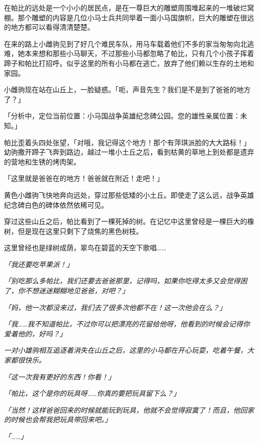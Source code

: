 \horizonline


在帕比的远处是一个小小的居民点，是在一尊巨大的雕塑周围堆起来的一堆破烂窝棚。那个雕塑的内容是几位小马士兵共同举着一面小马国旗帜，巨大的雕塑在很远的地方都可以看得清清楚楚。

在来的路上小雌驹见到了好几个难民车队，用马车载着他们不多的家当匆匆向北逃难，她本来想和那些小马聊天，不过那些小马都忽略了帕比，只有几个小孩子挥着蹄子和帕比打招呼。似乎这里的所有小马都在逃亡，放弃了他们赖以生存的土地和家园。

小雌驹现在站在山丘上，一脸疑惑。「呃，声音先生？我们是不是到了爸爸的地方了？」

「{\mt 分析中，定位当前位置：小马国战争英雄纪念碑公园。您的雄性亲属位置：未知。}」

帕比歪着头四处张望，「对哦，我记得这个地方！那个有萍琪派脸的大大路标！」幼驹撒开蹄子飞奔到路边，越过一堆小土丘之后，看到枯黄的草地上到处都是遗弃的营地和生锈的烤肉架。

「这里就是爸爸在的地方！爸爸就在附近！走吧！」

黄色小雌驹飞快地奔向远处，穿过那些低矮的小土丘。即使走了这么远，战争英雄纪念碑白色的碑体依然依稀可见。

穿过这些山丘之后，帕比看到了一棵死掉的树。在记忆中这里曾经是一棵巨大的橡树，但是现在这里只剩下了烧焦的黑色树枝。

这里曾经也是绿树成荫，翠鸟在碧蓝的天空下歌唱……

\emph{「我还要吃苹果派！」}

\emph{「别吃那么多帕比，我们还要去爸爸那里，记得吗，如果你吃得太多又会觉得困了，你不想迷迷糊糊地见爸爸，对吧？」}

\emph{「妈，他一次都没来过，我们去了很多次他都不在！这一次他会在么？」}

\emph{「我……我不知道帕比，不过你可以把漂亮的花留给他呀，他看到的时候会记得你爱着他的，好吗？」}

\emph{一对小雄驹相互追逐着消失在山丘之后，这里的小马都在开心玩耍，吃着午餐，大家都很快乐。}

\emph{「这一次我有更好的东西！你看！」}

\emph{「帕比，这个是你的玩具呀……你真的要把玩具留下么？」}

\emph{「当然！这样爸爸回来的时候就能玩到玩具，他就不会觉得寂寞了！而且，他回家的时候也会帮我把玩具带回来吧。」}

\emph{「……」}

